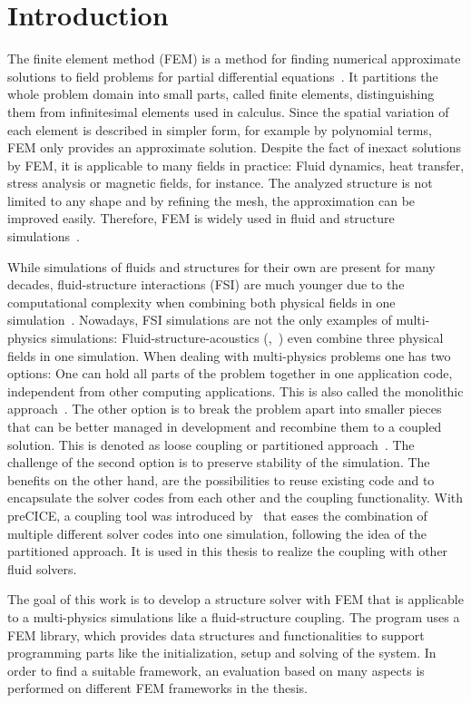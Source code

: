 \section{Introduction}
The finite element method (FEM) is a method for finding numerical approximate solutions to field problems for partial differential equations~\cite{cook2002concepts}. It partitions the whole problem domain into small parts, called finite elements, distinguishing them from infinitesimal elements used in calculus. Since the spatial variation of each element is described in simpler form, for example by polynomial terms, FEM only provides an approximate solution. Despite the fact of inexact solutions by FEM, it is applicable to many fields in practice: Fluid dynamics, heat transfer, stress analysis or magnetic fields, for instance. The analyzed structure is not limited to any shape and by refining the mesh, the approximation can be improved easily. Therefore, FEM is widely used in fluid and structure simulations~\cite{cook2002concepts}.

While simulations of fluids and structures for their own are present for many decades, fluid-structure interactions (FSI) are much younger due to the computational complexity when combining both physical fields in one simulation~\cite{gatzhammer2015efficient}. Nowadays, FSI simulations are not the only examples of multi-physics simulations: Fluid-structure-acoustics (\cite{link20092d},~\cite{schafer2010fluid}) even combine three physical fields in one simulation. When dealing with multi-physics problems one has two options: One can hold all parts of the problem together in one application code, independent from other computing applications. This is also called the monolithic approach~\cite{gatzhammer2015efficient}. The other option is to break the problem apart into smaller pieces that can be better managed in development and recombine them to a coupled solution. This is denoted as loose coupling or partitioned approach~\cite{lohner2006extending}. The challenge of the second option is to preserve stability of the simulation. The benefits on the other hand, are the possibilities to reuse existing code and to encapsulate the solver codes from each other and the coupling functionality. With preCICE, a coupling tool was introduced by~\cite{gatzhammer2015efficient} that eases the combination of multiple different solver codes into one simulation, following the idea of the partitioned approach. It is used in this thesis to realize the coupling with other fluid solvers.

The goal of this work is to develop a structure solver with FEM that is applicable to a multi-physics simulations like a fluid-structure coupling. The program uses a FEM library, which provides data structures and functionalities to support programming parts like the initialization, setup and solving of the system. In order to find a suitable framework, an evaluation based on many aspects is performed on different FEM frameworks in the thesis.

